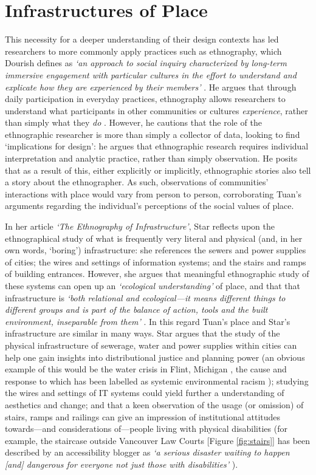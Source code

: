 \section{Infrastructures of Place}
\label{sec:InfrastructuresOfPlace}
This necessity for a deeper understanding of their design contexts has led researchers to more commonly apply practices such as ethnography, which Dourish defines as \textit{`an approach to social inquiry characterized by long-term immersive engagement with particular cultures in the effort to understand and explicate how they are experienced by their members'} \citep{Dourish2007b}. He argues that through daily participation in everyday practices, ethnography allows researchers to understand what participants in other communities or cultures \textit{experience}, rather than simply what they \textit{do} \citep{Dourish2006}. However, he cautions that the role of the ethnographic researcher is more than simply a collector of data, looking to find `implications for design': he argues that ethnographic research requires individual interpretation and analytic practice, rather than simply observation. He posits that as a result of this, either explicitly or implicitly, ethnographic stories also tell a story about the ethnographer. As such, observations of communities' interactions with place would vary from person to person, corroborating Tuan's arguments regarding the individual's perceptions of the social values of place.

In her article \textit{`The Ethnography of Infrastructure'}, Star reflects upon the ethnographical study of what is frequently very literal and physical (and, in her own words, `boring') infrastructure: she references the sewers and power supplies of cities; the wires and settings of information systems; and the stairs and ramps of building entrances. However, she argues that meaningful ethnographic study of these systems can open up an \textit{`ecological understanding'} of place, and that that infrastructure is \textit{`both relational and ecological---it means different things to different groups and is part of the balance of action, tools and the built environment, inseparable from them'} \citep{Star1999}. In this regard Tuan's place and Star's infrastructure are similar in many ways. Star argues that the study of the physical infrastructure of sewerage, water and power supplies within cities can help one gain insights into distributional justice and planning power (an obvious example of this would be the water crisis in Flint, Michigan \citep{Clark2018}, the cause and response to which has been labelled as systemic environmental racism \citep{MichiganCivilRightsCommission2017a}); studying the wires and settings of IT systems could yield further a understanding of aesthetics and change; and that a keen observation of the usage (or omission) of stairs, ramps and railings can give an impression of institutional attitudes towards---and considerations of---people living with physical disabilities (for example, the staircase outside Vancouver Law Courts [Figure \ref{fig:stairs}] has been described by an accessibility blogger as \textit{`a serious disaster waiting to happen [and] dangerous for everyone not just those with disabilities'} \cite{Wheeler-Hall2017}). 

